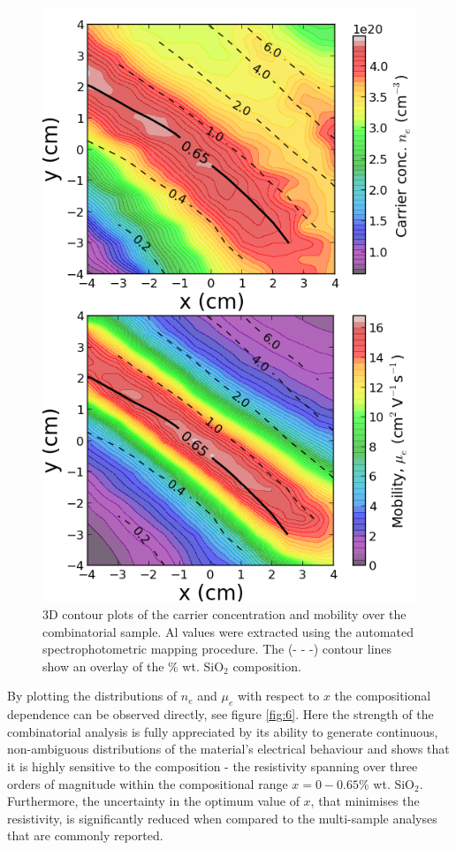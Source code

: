 \documentclass[final,5p,times]{elsarticle}
\begin{document}
\begin{figure}[t!]
\centering
\includegraphics[width=1.0\columnwidth]{figure2.png}
\caption{\label{fig:5} 3D contour plots of the carrier concentration and mobility over the combinatorial sample. Al values were extracted using the automated spectrophotometric mapping procedure. The (- - -) contour lines show an overlay of the \% wt. SiO$_{2}$ composition.}
\end{figure}
By plotting the distributions of $n_e$ and $\mu_e$ with respect to $x$ the compositional dependence can be observed directly, see figure \ref{fig:6}. Here the strength of the combinatorial analysis is fully appreciated by its ability to generate continuous, non-ambiguous distributions of the material's electrical behaviour and shows that it is highly sensitive to the composition - the resistivity spanning over three orders of magnitude within the compositional range $x = 0 - 0.65\%$ wt. SiO$_{2}$. Furthermore, the uncertainty in the optimum value of $x$, that minimises the resistivity, is significantly reduced when compared to the multi-sample analyses that are commonly reported. 
\end{document}
